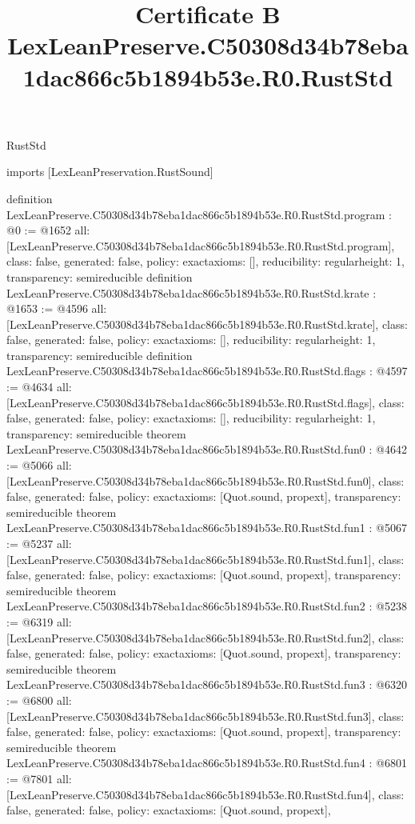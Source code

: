 \begin{lexlean}{RustStd}
\title{Certificate B LexLeanPreserve.C50308d34b78eba1dac866c5b1894b53e.R0.RustStd}
\begin{coremodule}
imports [LexLeanPreservation.RustSound]

definition LexLeanPreserve.C50308d34b78eba1dac866c5b1894b53e.R0.RustStd.program : @0 := @1652 {
  all: [LexLeanPreserve.C50308d34b78eba1dac866c5b1894b53e.R0.RustStd.program],
  class: false,
  generated: false,
  policy: exact{axioms: []},
  reducibility: regular{height: 1},
  transparency: semireducible
}
definition LexLeanPreserve.C50308d34b78eba1dac866c5b1894b53e.R0.RustStd.krate : @1653 := @4596 {
  all: [LexLeanPreserve.C50308d34b78eba1dac866c5b1894b53e.R0.RustStd.krate],
  class: false,
  generated: false,
  policy: exact{axioms: []},
  reducibility: regular{height: 1},
  transparency: semireducible
}
definition LexLeanPreserve.C50308d34b78eba1dac866c5b1894b53e.R0.RustStd.flags : @4597 := @4634 {
  all: [LexLeanPreserve.C50308d34b78eba1dac866c5b1894b53e.R0.RustStd.flags],
  class: false,
  generated: false,
  policy: exact{axioms: []},
  reducibility: regular{height: 1},
  transparency: semireducible
}
theorem LexLeanPreserve.C50308d34b78eba1dac866c5b1894b53e.R0.RustStd.fun0 : @4642 := @5066 {
  all: [LexLeanPreserve.C50308d34b78eba1dac866c5b1894b53e.R0.RustStd.fun0],
  class: false,
  generated: false,
  policy: exact{axioms: [Quot.sound, propext]},
  transparency: semireducible
}
theorem LexLeanPreserve.C50308d34b78eba1dac866c5b1894b53e.R0.RustStd.fun1 : @5067 := @5237 {
  all: [LexLeanPreserve.C50308d34b78eba1dac866c5b1894b53e.R0.RustStd.fun1],
  class: false,
  generated: false,
  policy: exact{axioms: [Quot.sound, propext]},
  transparency: semireducible
}
theorem LexLeanPreserve.C50308d34b78eba1dac866c5b1894b53e.R0.RustStd.fun2 : @5238 := @6319 {
  all: [LexLeanPreserve.C50308d34b78eba1dac866c5b1894b53e.R0.RustStd.fun2],
  class: false,
  generated: false,
  policy: exact{axioms: [Quot.sound, propext]},
  transparency: semireducible
}
theorem LexLeanPreserve.C50308d34b78eba1dac866c5b1894b53e.R0.RustStd.fun3 : @6320 := @6800 {
  all: [LexLeanPreserve.C50308d34b78eba1dac866c5b1894b53e.R0.RustStd.fun3],
  class: false,
  generated: false,
  policy: exact{axioms: [Quot.sound, propext]},
  transparency: semireducible
}
theorem LexLeanPreserve.C50308d34b78eba1dac866c5b1894b53e.R0.RustStd.fun4 : @6801 := @7801 {
  all: [LexLeanPreserve.C50308d34b78eba1dac866c5b1894b53e.R0.RustStd.fun4],
  class: false,
  generated: false,
  policy: exact{axioms: [Quot.sound, propext]},
}
\end{coremodule}
\end{lexlean}
